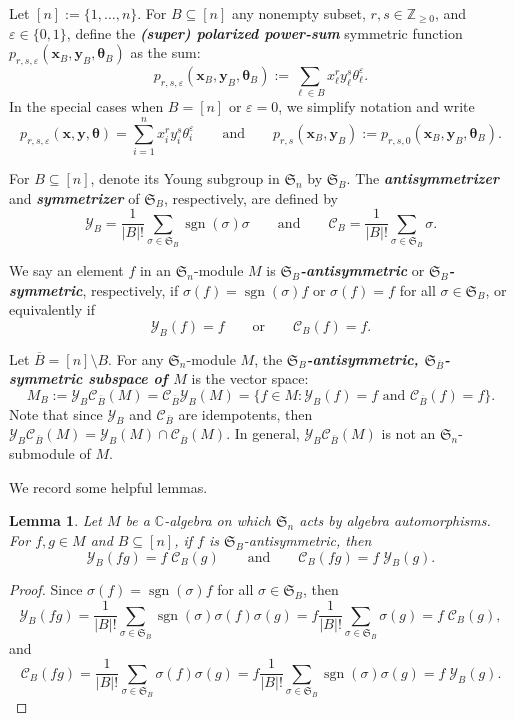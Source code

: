 \documentclass[11pt, noadjust, reqno]{amsart}
\newtheorem{lemma}[theorem]{Lemma}
\theoremstyle{definition}
\theoremstyle{remark}
\numberwithin{equation}{section}
\newcommand{\0}{\emptyset}
\newcommand{\Z}{\mathbb{Z}}
\newcommand{\C}{\mathbb{C}}
\renewcommand{\S}{\mathfrak{S}}
\newcommand{\cC}{\mathcal{C}}
\newcommand{\cY}{\mathcal{Y}}
\DeclareMathOperator{\sgn}{sgn}
\newcommand{\newword}[1]{\emph{\textbf{#1}}}
\begin{document}
Let $[n]:=\{1,\ldots, n\}$. For $B \subseteq [n]$ any nonempty subset, $r,s \in \Z_{\geq 0}$, and $\varepsilon \in \{0,1\}$, define the \newword{(super) polarized power-sum} symmetric function $p_{r,s,\varepsilon}(\bm{x}_B,\bm{y}_B, \bm\theta_B)$ as the sum:
\[
p_{r,s,\varepsilon}(\bm{x}_B,\bm{y}_B, \bm\theta_B) := \sum_{\ell \in B} x_\ell^r y_\ell^s \theta_\ell^{\varepsilon}. 
\]
In the special cases when $B = [n]$ or $\varepsilon =0$, we simplify notation and write
\[
p_{r,s,\varepsilon}(\bm{x},\bm{y},\bm{\theta})=\sum_{i=1}^n x_i^r y_i^s \theta_i^\varepsilon
\qquad \text{and} \qquad
p_{r,s}(\bm{x}_B,\bm{y}_B):=
p_{r,s,0}(\bm{x}_B,\bm{y}_B,\bm{\theta}_B).\]


For $B \subseteq [n]$, denote its Young subgroup in $\S_n$ by $\mathfrak{S}_B$. The \newword{antisymmetrizer} and \newword{symmetrizer} of $\mathfrak{S}_B$, respectively, are defined by
\[
     \cY_B= \frac{1}{|B|!}\sum_{\sigma \in \mathfrak{S}_B} \sgn(\sigma) \sigma
     \qquad \text{and} \qquad \cC_B= \frac{1}{|B|!}\sum_{\sigma \in \mathfrak{S}_B} \sigma. 
\]

We say an element $f$ in an $\S_n$-module $M$ is \newword{$\S_B$-antisymmetric} or \newword{$\S_B$-symmetric}, respectively, if $\sigma(f)=\sgn(\sigma)f$ or $\sigma(f) = f$ for all $\sigma \in \S_B$, or equivalently if
\[
\cY_B(f) = f \qquad \text{or} \qquad \cC_B(f) =f.
\]

Let $\overline{B}= [n]\setminus B$. For any $\S_n$-module $M$, the \newword{$\S_B$-antisymmetric, $\S_{\overline{B}}$-symmetric subspace of $M$} is the vector space:
\[
M_B:=\cY_B \cC_{\overline{B}} (M) = \cC_{\overline{B}} \cY_B(M) = \{ f \in M :  \cY_{B} (f)=f \text{ and } \cC_{\overline{B}}(f)=f \}.
\]
Note that since $\cY_{B}$ and $\cC_{\overline{B}}$ are idempotents, then $\cY_B \cC_{\overline{B}} (M)= \cY_{B}(M) \cap \cC_{\overline{B}}(M)$. 
In general, $\cY_B \cC_{\overline{B}} (M)$ is not an $\mathfrak{S}_n$-submodule of $M$.

We record some helpful lemmas.

\begin{lemma}\label{lem:Y_to_C}
Let $M$ be a $\C$-algebra on which $\S_n$ acts by algebra automorphisms. 
    For $f,g \in M$ and $B \subseteq [n]$, if $f$ is $\S_B$-antisymmetric, then
    \[
    \cY_B(fg) = f \; \cC_B(g) \qquad \text{and} \qquad \cC_B(fg) = f \; \cY_B(g) .
    \]
\end{lemma}
\begin{proof}
Since $\sigma(f) = \sgn(\sigma) f$ for all $\sigma \in \S_B$, then
    \[
    \cY_B(fg)
    = \frac{1}{|B|!}\sum_{\sigma \in \S_B} \sgn(\sigma) \sigma(f)\sigma(g)
    = f \frac{1}{|B|!} \sum_{\sigma \in \S_B} \sigma(g) = f \; \cC_B(g),
    \]
    and
     \[
    \cC_B(fg)
    = \frac{1}{|B|!}\sum_{\sigma \in \S_B}  \sigma(f)\sigma(g)
    = f \frac{1}{|B|!} \sum_{\sigma \in \S_B} \sgn(\sigma)\sigma(g) = f \; \cY_B(g).
    \]
\end{proof}
\end{document}
